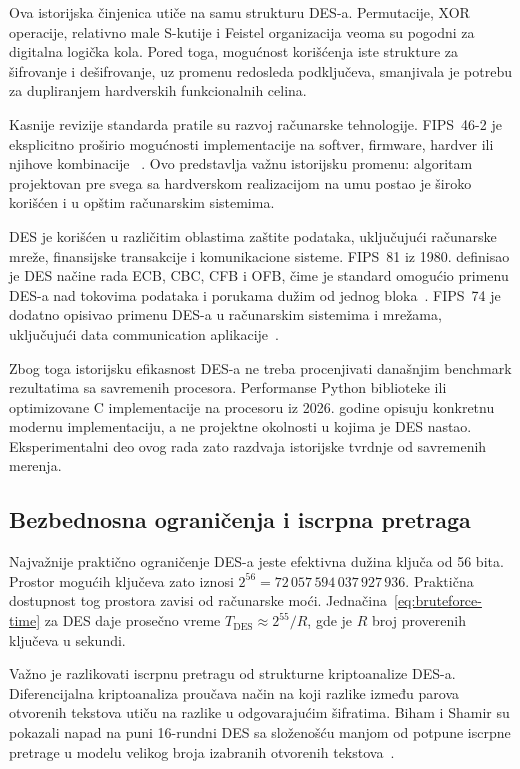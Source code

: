 Ova istorijska činjenica utiče na samu strukturu DES-a. Permutacije,
XOR operacije, relativno male S-kutije i Feistel organizacija veoma su
pogodni za digitalna logička kola. Pored toga, mogućnost korišćenja
iste strukture za šifrovanje i dešifrovanje, uz promenu redosleda
podključeva, smanjivala je potrebu za dupliranjem hardverskih
funkcionalnih celina.

Kasnije revizije standarda pratile su razvoj računarske tehnologije.
FIPS~46-2 je eksplicitno proširio mogućnosti implementacije na
softver, firmware, hardver ili njihove kombinacije
~\cite{fips46-2-history}. Ovo predstavlja važnu istorijsku promenu:
algoritam projektovan pre svega sa hardverskom realizacijom na umu
postao je široko korišćen i u opštim računarskim sistemima.

DES je korišćen u različitim oblastima zaštite podataka, uključujući
računarske mreže, finansijske transakcije i komunikacione sisteme.
FIPS~81 iz 1980. definisao je DES načine rada ECB, CBC, CFB i OFB,
čime je standard omogućio primenu DES-a nad tokovima podataka i
porukama dužim od jednog bloka~\cite{fips81}. FIPS~74 je dodatno
opisivao primenu DES-a u računarskim sistemima i mrežama, uključujući
data communication aplikacije~\cite{fips74}.

Zbog toga istorijsku efikasnost DES-a ne treba procenjivati današnjim
benchmark rezultatima sa savremenih procesora. Performanse Python
biblioteke ili optimizovane C implementacije na procesoru iz 2026.
godine opisuju konkretnu modernu implementaciju, a ne projektne
okolnosti u kojima je DES nastao. Eksperimentalni deo ovog rada zato
razdvaja istorijske tvrdnje od savremenih merenja.


\subsection{Bezbednosna ograničenja i iscrpna pretraga}
\label{subsec:des_security}

Najvažnije praktično ograničenje DES-a jeste efektivna dužina ključa
od 56 bita. Prostor mogućih ključeva zato iznosi
$2^{56} = 72\,057\,594\,037\,927\,936$.
Praktična dostupnost tog prostora zavisi od računarske moći.
Jednačina~\eqref{eq:bruteforce-time} za DES daje prosečno vreme
$T_{\mathrm{DES}}\approx 2^{55}/R$, gde je $R$ broj proverenih
ključeva u sekundi.

Važno je razlikovati iscrpnu pretragu od strukturne kriptoanalize
DES-a. Diferencijalna kriptoanaliza proučava način na koji razlike
između parova otvorenih tekstova utiču na razlike u odgovarajućim
šifratima. Biham i Shamir su pokazali napad na puni 16-rundni DES sa
složenošću manjom od potpune iscrpne pretrage u modelu velikog broja
izabranih otvorenih tekstova~\cite{biham-shamir-full-des-1993}.

